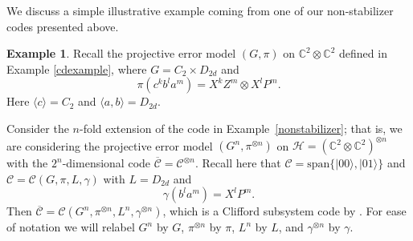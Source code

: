 \documentclass[11pt]{article}
\theoremstyle{definition}
\newtheorem{example}{Example}
\def\ket#1{| #1 \rangle}
\newcommand{\bbC}{\mathbb{C}}
\newcommand{\calC}{\mathcal{C}}
\begin{document}
We discuss a simple illustrative example coming from one of our non-stabilizer codes presented above. 

\begin{example}\label{example:correction for XPZ}
    Recall the projective error model $(G,\pi)$ on $\bbC^2 \otimes \bbC^2$ defined in Example \ref{cdexample}, where $G = C_2 \times D_{2d}$ and
    \[
        \pi(c^kb^la^m) = X^kZ^m \otimes X^lP^m.
    \]
    Here $\langle c \rangle = C_2$ and $\langle a,b \rangle = D_{2d}$.
    
    Consider the $n$-fold extension of the code in Example~\ref{nonstabilizer}; that is, we are considering the projective error model $(G^n,\pi^{\otimes n})$ on $\mathcal H = (\mathbb C^2\otimes \mathbb C^2)^{\otimes n}$ with the $2^n$-dimensional code $\overline{\mathcal C} = \mathcal C^{\otimes n}$. Recall here that $\mathcal C = \mathrm{span}\{ \ket{00}, \ket{01} \}$ and $\calC = \calC(G,\pi,L,\gamma)$ with $L = D_{2d}$ and
    \[
        \gamma(b^la^m) = X^lP^m.
    \]
    Then $\overline{\calC} = \calC(G^n,\pi^{\otimes n},L^n,\gamma^{\otimes n})$, which is a Clifford subsystem code by \cite[Proposition 10.1]{Eidesen2025}. For ease of notation we will relabel $G^n$ by $G$, $\pi^{\otimes n}$ by $\pi$, $L^n$ by $L$, and $\gamma^{\otimes n}$ by $\gamma$.
    

\end{example}
\end{document}
